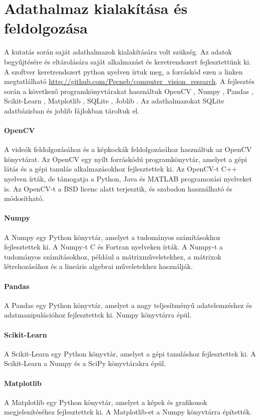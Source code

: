 \documentclass[12pt,a4paper]{article}
\begin{document}
\newpage
\section{Adathalmaz kialakítása és feldolgozása}
A kutatás során saját adathalmazok kialakítására volt szükség. Az adatok begyűjtésére és eltárolására saját alkalmazást és keretrendszert
fejlesztettünk ki. A szoftver keretrendszert python nyelven írtuk meg, a forráskód ezen a linken megtatlálható \url{http://github.com/Pecneb/computer_vision_research}.
A fejlesztés során a következő programkönyvtárakat használtuk OpenCV \cite{opencv_library}, Numpy \cite{harris2020array}, Pandas \cite{reback2020pandas},
Scikit-Learn \cite{scikit-learn}, Matplotlib \cite{Hunter:2007}, SQLite \cite{sqlite2020hipp}, Joblib \cite{joblib_library}. Az adathalmazokat SQLite adatbázisban és
joblib fájlokban tároltuk el. 
\paragraph{OpenCV} A videók feldolgozásához és a képkockák feldolgozásához használtuk az OpenCV könyvtárat. Az OpenCV egy nyílt forráskódú programkönyvtár, amelyet a gépi látás és a gépi tanulás alkalmazásokhoz fejlesztettek ki. Az OpenCV-t C++ nyelven írták, de támogatja a Python, Java és MATLAB programozási nyelveket is. Az OpenCV-t a BSD licenc alatt terjesztik, és szabadon használható és módosítható.
\paragraph{Numpy} A Numpy egy Python könyvtár, amelyet a tudományos számításokhoz fejlesztettek ki. A Numpy-t C és Fortran nyelveken írták. A Numpy-t a tudományos számításokhoz, például a mátrixműveletekhez, a mátrixok létrehozásához és a lineáris algebrai műveletekhez használják.
\paragraph{Pandas} A Pandas egy Python könyvtár, amelyet a nagy teljesítményű adatelemzéshez és adatmanipulációhoz fejlesztettek ki. Numpy könyvtárra épül.
\paragraph{Scikit-Learn} A Scikit-Learn egy Python könyvtár, amelyet a gépi tanuláshoz fejlesztettek ki. A Scikit-Learn a Numpy és a SciPy könyvtárakra épül.
\paragraph{Matplotlib} A Matplotlib egy Python könyvtár, amelyet a képek és grafikonok megjelenítéséhez fejlesztettek ki. A Matplotlib-et a Numpy könyvtárra építették.
\end{document}
